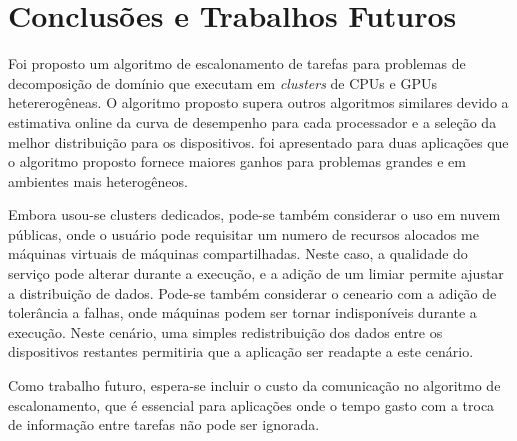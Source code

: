 \section{Conclusões e Trabalhos Futuros}\label{cap6:conclusao}

Foi proposto um algoritmo de escalonamento de tarefas para problemas de decomposição de domínio que executam em \emph{clusters} de CPUs e GPUs hetererogêneas. O algoritmo proposto supera outros algoritmos similares devido a estimativa online da curva de desempenho para cada  processador e a seleção da melhor distribuição para os dispositivos. foi apresentado para duas aplicações que o algoritmo proposto fornece maiores ganhos para problemas grandes e em ambientes mais heterogêneos.

Embora usou-se clusters dedicados, pode-se também considerar o uso em nuvem públicas, onde o usuário pode requisitar um numero de recursos alocados me máquinas virtuais de máquinas compartilhadas. Neste caso, a qualidade do serviço pode alterar durante a execução, e a adição de um limiar permite ajustar a distribuição de dados. Pode-se também considerar o ceneario com a adição de tolerância a falhas, onde máquinas podem ser tornar indisponíveis durante a execução. Neste cenário, uma simples redistribuição dos dados entre os dispositivos restantes permitiria que a aplicação ser readapte a este cenário.

Como trabalho futuro, espera-se incluir o custo da comunicação no algoritmo de escalonamento, que é essencial para aplicações onde o tempo gasto com a troca de informação entre tarefas não pode ser ignorada.


